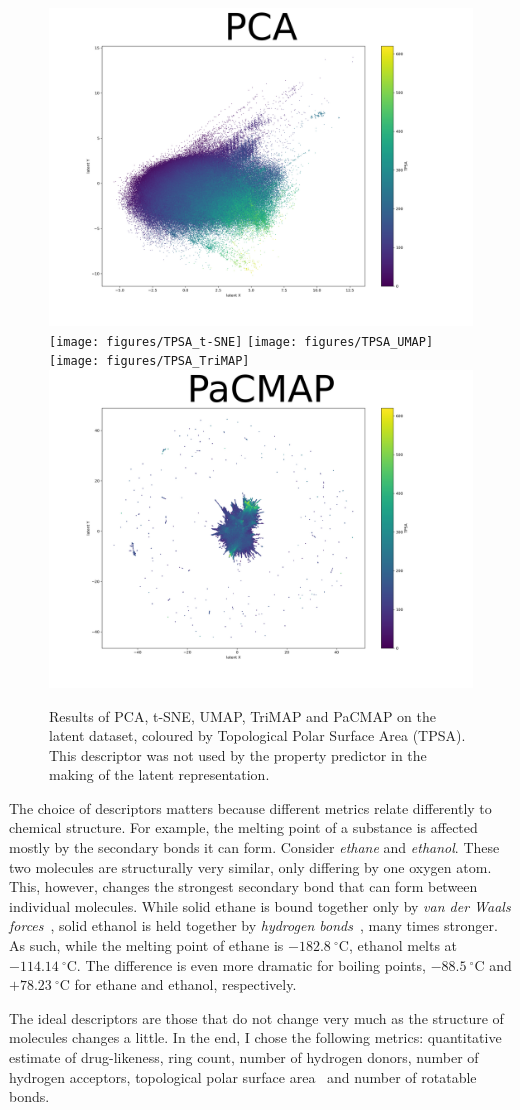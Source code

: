 \begin{figure}[!ht]
	\centering
	\includegraphics[width=0.49\columnwidth]{figures/TPSA_PCA}
	\texttt{[image: figures/TPSA\_t-SNE]}
	\texttt{[image: figures/TPSA\_UMAP]}
	\texttt{[image: figures/TPSA\_TriMAP]}
	\includegraphics[width=0.49\columnwidth]{figures/TPSA_PaCMAP}
	\caption{Results of PCA, t-SNE, UMAP, TriMAP and PaCMAP on the latent dataset, coloured by Topological Polar Surface Area (TPSA). This descriptor was not used by the property predictor in the making of the latent representation.}
	\label{fig:TPSA}
\end{figure}

The choice of descriptors matters because different metrics relate differently to chemical structure. For example, the melting point of a substance is affected mostly by the secondary bonds it can form. Consider \textit{ethane} and \textit{ethanol}. These two molecules are structurally very similar, only differing by one oxygen atom. This, however, changes the strongest secondary bond that can form between individual molecules. While solid ethane is bound together only by \textit{van der Waals forces}~\cite{bib:vanderwaals}, solid ethanol is held together by \textit{hydrogen bonds}~\cite{bib:hbond}, many times stronger. As such, while the melting point of ethane is $-182.8~^\circ$C, ethanol melts at $-114.14~^\circ$C. The difference is even more dramatic for boiling points, $-88.5~^\circ$C and $+78.23~^\circ$C for ethane and ethanol, respectively.

The ideal descriptors are those that do not change very much as the structure of molecules changes a little. In the end, I chose the following metrics: quantitative estimate of drug-likeness, ring count, number of hydrogen donors, number of hydrogen acceptors, topological polar surface area~\cite{bib:tpsa} and number of rotatable bonds.

